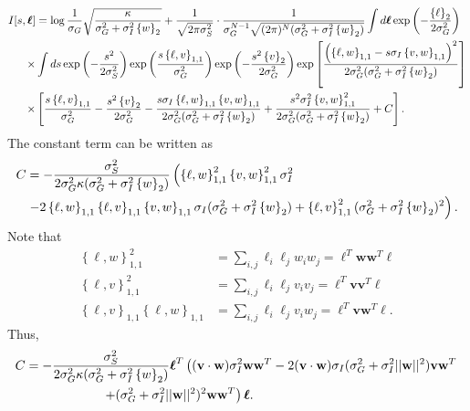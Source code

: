 \documentclass[11pt]{article}
\begin{document}
\begin{align}
	I[s,\boldsymbol{\ell}] &= \log \frac{1}{\sigma_G}\sqrt{\frac{\kappa}{\sigma_G^2 +\sigma_I^2 \left\{w\right\}_2}}  +\frac{1}{\sqrt{2\pi \sigma_S^2}}\cdot \frac{1}{\sigma_G^{N-1}\sqrt{(2\pi)^N(\sigma_G^2 + \sigma_I^2 \left\{w\right\}_2)}} \int d\boldsymbol{\ell} \exp\left(-\frac{\left\{\ell \right\}_2}{2\sigma_G^2}\right) \notag \\
	 \times & \int ds \exp\left(-\frac{s^2}{2\sigma_S^2}\right)\exp\left(\frac{s\left\{\ell, v\right\}_{1,1}}{\sigma_G^2} \right)\exp\left(-\frac{s^2 \left\{v\right\}_2}{2\sigma_G^2}\right)\exp\left[\frac{\left(\left\{\ell, w\right\}_{1,1} - s \sigma_I \left\{v,w\right\}_{1,1}\right)^2}{2\sigma_G^2 (\sigma_G^2 + \sigma_I^2 \left\{w\right\}_2)}\right] \notag \\
	 \times & \left[\frac{s \left\{\ell, v\right\}_{1,1}}{\sigma_G^2} - \frac{s^2 \left\{v\right\}_2}{2\sigma_G^2} - \frac{s \sigma_I\left\{\ell, w\right\}_{1,1} \left\{v,w\right\}_{1,1}}{2\sigma_G^2 (\sigma_G^2 + \sigma_I^2 \left\{w\right\}_2)}+\frac{s^2 \sigma_I^2\left\{v,w\right\}_{1,1}^2}{2\sigma_G^2 (\sigma_G^2 + \sigma_I^2 \left\{w\right\}_2)} + C\right].
\end{align}
The constant term can be written as 
\begin{align}
	C &= -\frac{\sigma_S^2}{2\sigma_G^2 \kappa (\sigma_G^2 + \sigma_I^2 \left\{w\right\}_2)} \left(\left\{\ell, w\right\}_{1,1}^2 \left\{v,w\right\}_{1,1}^2 \sigma_I^2   \right. \notag \\
	&\left. - 2 \left\{\ell, w\right\}_{1,1} \left\{\ell ,v \right\}_{1,1} \left\{v,w\right\}_{1,1} \sigma_I (\sigma_G^2 + \sigma_I^2 \left\{w\right\}_2) + \left\{\ell, v\right\}_{1,1}^2 (\sigma_G^2 +\sigma_I^2 \left\{w\right\}_2)^2\right).
\end{align}
Note that 
\begin{align}
	\left\{\ell, w\right\}_{1,1}^2 &= \sum_{i,j} \ell_i \ell_j w_i w_j = \boldsymbol{\ell}^T \mathbf{ww}^T \boldsymbol{\ell} \\
	\left\{\ell, v\right\}_{1,1}^2 &= \sum_{i,j} \ell_i \ell_j  v_i v_j = \boldsymbol{\ell}^T \mathbf{vv}^T \boldsymbol{\ell} \\
	\left\{\ell, v\right\}_{1,1} \left\{\ell,w\right\}_{1,1}&= \sum_{i,j} \ell_i \ell_j v_i w_j= \boldsymbol{\ell}^T \mathbf{vw}^T \boldsymbol{\ell}.
\end{align}
Thus,
\begin{align}
C &= -\frac{\sigma_S^2}{2\sigma_G^2 \kappa (\sigma_G^2 + \sigma_I^2 \left\{w\right\}_2)}\boldsymbol{\ell}^T \left((\mathbf{v}\cdot \mathbf{w}) \sigma_I^2 \mathbf{w}\mathbf{w}^T - 2(\mathbf{v}\cdot \mathbf{w}) \sigma_I (\sigma_G^2 +\sigma_I^2 ||\mathbf{w}||^2) \mathbf{v}\mathbf{w}^T \right. \notag \\
& \qquad \qquad \qquad \left. + (\sigma_G^2 +\sigma_I^2 ||\mathbf{w}||^2)^2\mathbf{w}\mathbf{w}^T \right) \boldsymbol{\ell}.
\end{align}
\end{document}
